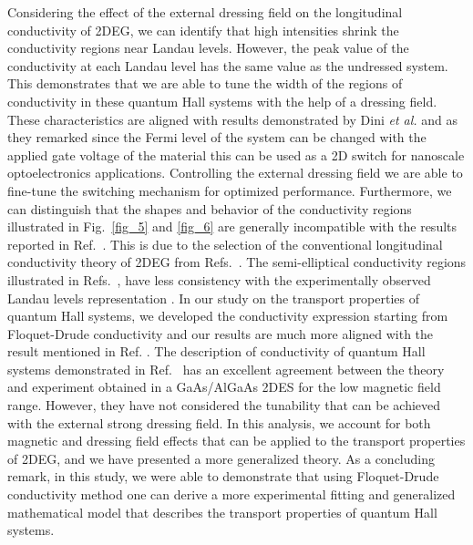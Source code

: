 Considering the effect of the external dressing field on the longitudinal conductivity of 2DEG, we can identify that high intensities shrink the conductivity regions near Landau levels. However, the peak value of the conductivity at each Landau level has the same value as the undressed system. This demonstrates that we are able to tune the width of the regions of conductivity in these quantum Hall systems with the help of a dressing field.
These characteristics are aligned with results demonstrated by Dini \textit{et al.} \cite{dini16} and as they remarked since the Fermi level of the system can be changed with the applied gate voltage of the material this can be used as a 2D switch for nanoscale optoelectronics applications. Controlling  the external dressing field we are able to fine-tune the switching mechanism for optimized performance.
Furthermore, we can distinguish that the shapes and behavior of the conductivity regions illustrated in Fig.~\ref{fig_5} and \ref{fig_6} are generally incompatible with the results reported in Ref.~\cite{dini16}. This is due to the selection of the conventional longitudinal conductivity theory of 2DEG from Refs.~\cite{ando74_1,ando82}. The semi-elliptical conductivity regions illustrated in Refs.~\cite{dini16,ando74_1,ando82}, have less consistency with the experimentally observed Landau levels representation \cite{endo09}.
In our study on the transport properties of quantum Hall systems, we developed the conductivity expression starting from Floquet-Drude conductivity \cite{wackerl20} and our results are much more aligned with the result mentioned in Ref. \cite{endo09}.
The description of conductivity of quantum Hall systems demonstrated in Ref.~\cite{endo09} has an excellent agreement between the theory and experiment obtained in a GaAs/AlGaAs 2DES for the low magnetic field range. However, they have not considered the tunability that can be achieved with the external strong dressing field. In this analysis, we account for both magnetic and dressing field effects that can be applied to the transport properties of 2DEG, and we have presented a more generalized theory. As a concluding remark, in this study, we were able to demonstrate that using Floquet-Drude conductivity method one can derive a more experimental fitting and generalized mathematical model that describes the transport properties of quantum Hall systems.
